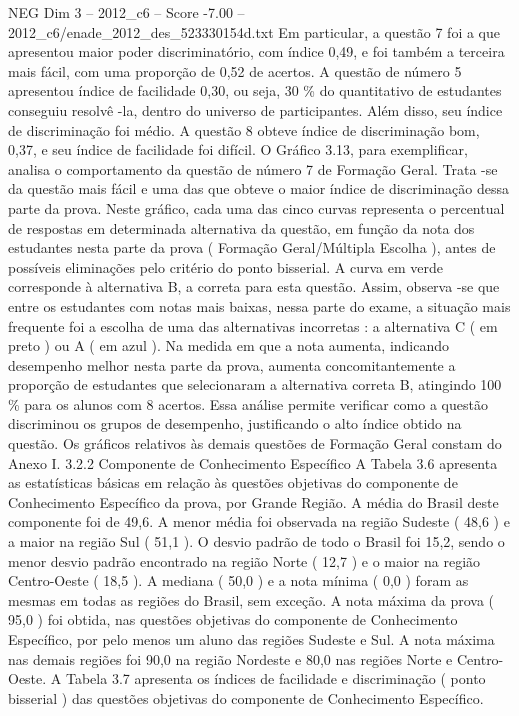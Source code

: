 \begin{textsample}{NEG Dim 3 – 2012\_c6 – Score -7.00 – 2012\_c6/enade\_2012\_des\_523330154d.txt}
Em particular, a questão 7 foi a que apresentou maior poder discriminatório, com índice 0,49, e foi também a terceira mais fácil, com uma proporção de 0,52 de acertos.
A questão de número 5 apresentou índice de facilidade 0,30, ou seja, 30 \% do quantitativo de estudantes conseguiu resolvê -la, dentro do universo de participantes.
Além disso, seu índice de discriminação foi médio.
A questão 8 obteve índice de discriminação bom, 0,37, e seu índice de facilidade foi difícil.
O Gráfico 3.13, para exemplificar, analisa o comportamento da questão de número 7 de Formação Geral.
Trata -se da questão mais fácil e uma das que obteve o maior índice de discriminação dessa parte da prova.
Neste gráfico, cada uma das cinco curvas representa o percentual de respostas em determinada alternativa da questão, em função da nota dos estudantes nesta parte da prova ( Formação Geral/Múltipla Escolha ), antes de possíveis eliminações pelo critério do ponto bisserial.
A curva em verde corresponde à alternativa B, a correta para esta questão.
Assim, observa -se que entre os estudantes com notas mais baixas, nessa parte do exame, a situação mais frequente foi a escolha de uma das alternativas incorretas : a alternativa C ( em preto ) ou A ( em azul ).
Na medida em que a nota aumenta, indicando desempenho melhor nesta parte da prova, aumenta concomitantemente a proporção de estudantes que selecionaram a alternativa correta B, atingindo 100 \% para os alunos com 8 acertos.
Essa análise permite verificar como a questão discriminou os grupos de desempenho, justificando o alto índice obtido na questão.
Os gráficos relativos às demais questões de Formação Geral constam do Anexo I. 3.2.2 Componente de Conhecimento Específico A Tabela 3.6 apresenta as estatísticas básicas em relação às questões objetivas do componente de Conhecimento Específico da prova, por Grande Região.
A média do Brasil deste componente foi de 49,6.
A menor média foi observada na região Sudeste ( 48,6 ) e a maior na região Sul ( 51,1 ).
O desvio padrão de todo o Brasil foi 15,2, sendo o menor desvio padrão encontrado na região Norte ( 12,7 ) e o maior na região Centro-Oeste ( 18,5 ).
A mediana ( 50,0 ) e a nota mínima ( 0,0 ) foram as mesmas em todas as regiões do Brasil, sem exceção.
A nota máxima da prova ( 95,0 ) foi obtida, nas questões objetivas do componente de Conhecimento Específico, por pelo menos um aluno das regiões Sudeste e Sul.
A nota máxima nas demais regiões foi 90,0 na região Nordeste e 80,0 nas regiões Norte e Centro-Oeste.
A Tabela 3.7 apresenta os índices de facilidade e discriminação ( ponto bisserial ) das questões objetivas do componente de Conhecimento Específico.

\end{textsample}
